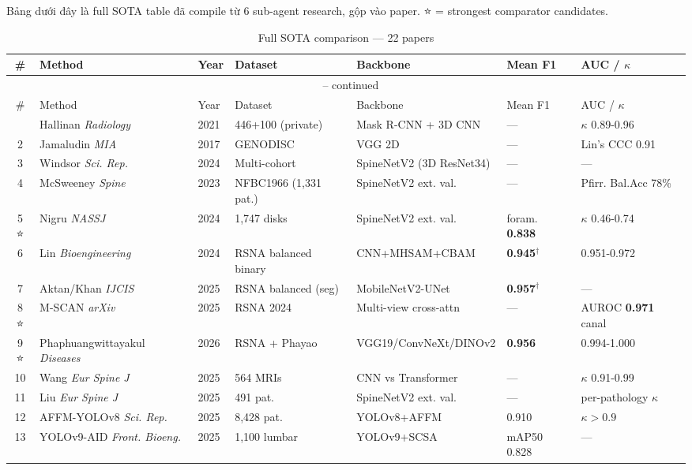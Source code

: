 \documentclass[11pt,a4paper]{article}
\newcommand{\best}[1]{\textcolor{best}{\textbf{#1}}}
\begin{document}
\noindent Bảng dưới đây là full SOTA table đã compile từ 6 sub-agent
research, gộp vào paper. ⭐ = strongest comparator candidates.

\begin{longtable}{@{}clp{1cm}p{2.5cm}p{2.5cm}p{2cm}p{2cm}@{}}
\caption{Full SOTA comparison --- 22 papers}\\
\toprule
\rowcolor{tablehdr}
\# & Method & Year & Dataset & Backbone & Mean F1 & AUC / $\kappa$ \\
\midrule
\endfirsthead
\multicolumn{7}{c}{\tablename\ \thetable{} -- continued}\\
\toprule
\rowcolor{tablehdr}
\# & Method & Year & Dataset & Backbone & Mean F1 & AUC / $\kappa$ \\
\midrule
\endhead
\bottomrule
\endlastfoot
1 & Hallinan \emph{Radiology} & 2021 & 446+100 (private) & Mask R-CNN + 3D CNN & --- & $\kappa$ 0.89-0.96 \\
2 & Jamaludin \emph{MIA} & 2017 & GENODISC & VGG 2D & --- & Lin's CCC 0.91 \\
3 & Windsor \emph{Sci. Rep.} & 2024 & Multi-cohort & SpineNetV2 (3D ResNet34) & --- & --- \\
4 & McSweeney \emph{Spine} & 2023 & NFBC1966 (1,331 pat.) & SpineNetV2 ext. val. & --- & Pfirr. Bal.Acc 78\% \\
5 ⭐ & Nigru \emph{NASSJ} & 2024 & 1,747 disks & SpineNetV2 ext. val. & foram. \best{0.838} & $\kappa$ 0.46-0.74 \\
6 & Lin \emph{Bioengineering} & 2024 & RSNA balanced binary & CNN+MHSAM+CBAM & \best{0.945}$^\dagger$ & 0.951-0.972 \\
7 & Aktan/Khan \emph{IJCIS} & 2025 & RSNA balanced (seg) & MobileNetV2-UNet & \best{0.957}$^\dagger$ & --- \\
8 ⭐ & M-SCAN \emph{arXiv} & 2025 & RSNA 2024 & Multi-view cross-attn & --- & AUROC \best{0.971} canal \\
9 ⭐ & Phaphuangwittayakul \emph{Diseases} & 2026 & RSNA + Phayao & VGG19/ConvNeXt/DINOv2 & \best{0.956} & 0.994-1.000 \\
10 & Wang \emph{Eur Spine J} & 2025 & 564 MRIs & CNN vs Transformer & --- & $\kappa$ 0.91-0.99 \\
11 & Liu \emph{Eur Spine J} & 2025 & 491 pat. & SpineNetV2 ext. val. & --- & per-pathology $\kappa$ \\
12 & AFFM-YOLOv8 \emph{Sci. Rep.} & 2025 & 8,428 pat. & YOLOv8+AFFM & 0.910 & $\kappa > 0.9$ \\
13 & YOLOv9-AID \emph{Front. Bioeng.} & 2025 & 1,100 lumbar & YOLOv9+SCSA & mAP50 0.828 & --- \\

\end{longtable}
\end{document}
